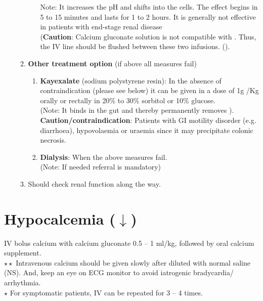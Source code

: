 \documentclass[11pt,a4paper]{report}
\begin{document}
\begin{enumerate}
\begin{enumerate}
\begin{enumerate}
			Note: It increases the pH and shifts  into the cells. The effect begins in 5 to 15 minutes and lasts for 1 to 2 hours. It is generally not effective in patients with end-stage renal disease\\ 
			(\textbf{Caution}: Calcium gluconate solution is not compatible with . Thus, the IV line should be flushed between these two infusions. ({}).
		\end{enumerate}
		\item \textbf{Other treatment option} (if above all measures fail)
		\begin{enumerate}
			\item \textbf{Kayexalate} (sodium polystyrene resin): In the absence of contraindication (please see below) it can be given in a dose of 1g /Kg orally or rectally in 20\% to 30\% sorbitol or 10\% glucose. \\
			(Note: It binds  in the gut and thereby permanently removes ).\\
			\textbf{Caution/contraindication}: Patients with GI motility disorder (e.g. diarrhoea), hypovolaemia or uraemia since it may precipitate colonic necrosis. 
			\item \textbf{Dialysis}: When the above measures fail. \\
			(Note: If needed referral is mandatory)
		\end{enumerate}
		\item Should check renal function along the way. 
	\end{enumerate}
\end{enumerate}

\newpage
\section[Hypocalcemia]{Hypocalcemia ({\color{blue}$\downarrow$})}
IV bolus calcium with calcium gluconate 0.5 -- 1 ml/kg, followed by oral calcium supplement. \\
{\color{red}\textbf{$\star\star$}} Intravenous calcium should be given slowly after diluted with normal saline (NS). And, keep an eye on ECG monitor to avoid iatrogenic bradycardia/ arrhythmia.\\
{\color{red}$\star$} For symptomatic patients, IV can be repeated for 3 -- 4 times. 
\end{document}
